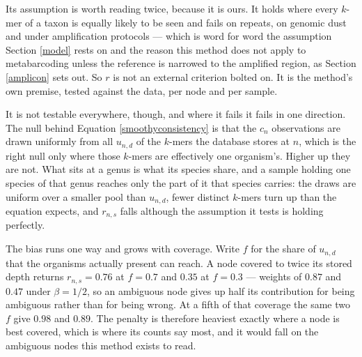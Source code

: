 \documentclass[pdflatex,sn-vancouver-num]{sn-jnl}
\begin{document}
    Its assumption is worth reading twice, because it is ours. It holds where every $k$-mer of a taxon
    is equally likely to be seen and fails on repeats, on genomic dust and under amplification
    protocols --- which is word for word the assumption Section \ref{model} rests on and the reason
    this method does not apply to metabarcoding unless the reference is narrowed to the amplified
    region, as Section \ref{amplicon} sets out. So $r$ is not an external criterion bolted on. It is
    the method's own premise, tested against the data, per node and per sample.

    It is not testable everywhere, though, and where it fails it fails in one direction. The null
    behind Equation \eqref{smoothyconsistency} is that the $c_n$ observations are drawn uniformly
    from all $u_{n,d}$ of the $k$-mers the database stores at $n$, which is the right null only where
    those $k$-mers are effectively one organism's. Higher up they are not. What sits at a genus is
    what its species share, and a sample holding one species of that genus reaches only the part of
    it that species carries: the draws are uniform over a smaller pool than $u_{n,d}$, fewer distinct
    $k$-mers turn up than the equation expects, and $r_{n,s}$ falls although the assumption it tests
    is holding perfectly.

    The bias runs one way and grows with coverage. Write $f$ for the share of $u_{n,d}$ that the
    organisms actually present can reach. A node covered to twice its stored depth returns
    $r_{n,s} = 0.76$ at $f = 0.7$ and $0.35$ at $f = 0.3$ --- weights of $0.87$ and $0.47$ under
    $\beta = 1/2$, so an ambiguous node gives up half its contribution for being ambiguous rather
    than for being wrong. At a fifth of that coverage the same two $f$ give $0.98$ and $0.89$. The
    penalty is therefore heaviest exactly where a node is best covered, which is where its counts
    say most, and it would fall on the ambiguous nodes this method exists to read.
\end{document}
